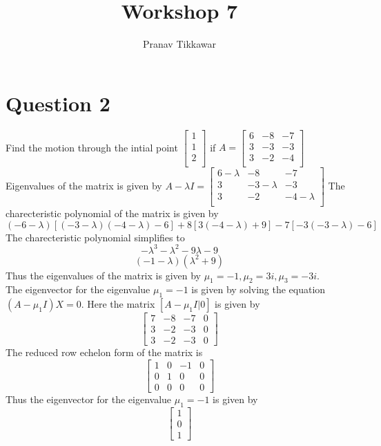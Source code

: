 \documentclass{article}
\author{Pranav Tikkawar}
\title{Workshop 7}
\begin{document}
\maketitle
\section*{Question 2}
Find the motion through the intial point $\begin{bmatrix}
    1\\
    1\\
    2\\
\end{bmatrix}$ if $ A = \begin{bmatrix}
    6 & -8 & -7 \\
    3 & -3 & -3 \\
    3 & -2 & -4 \\
\end{bmatrix}$ \\
Eigenvalues of the matrix is given by $A - \lambda I = \begin{bmatrix}
    6 - \lambda & -8 & -7 \\
    3 & -3 - \lambda & -3 \\
    3 & -2 & -4 - \lambda \\
\end{bmatrix} $
The charecteristic polynomial of the matrix is given by
$$(-6 - \lambda)[(-3-\lambda)(-4-\lambda) - 6] + 8[3(-4-\lambda) + 9] - 7[-3(-3-\lambda) - 6] $$
The charecteristic polynomial simplifies to $$-\lambda^3 - \lambda^2 -9 \lambda - 9$$
$$(-1 - \lambda)(\lambda^2 + 9)$$
Thus the eigenvalues of the matrix is given by $\mu_1 = -1, \mu_2 = 3i, \mu_3 = -3i$.\\
The eigenvector for the eigenvalue $\mu_1 = -1$ is given by solving the equation $(A - \mu_1 I)X = 0$. Here the matrix $[A - \mu_1 I | 0]$ is given by
$$\begin{bmatrix}
    7 & -8 & -7 & 0\\
    3 & -2 & -3 & 0\\
    3 & -2 & -3 &0
\end{bmatrix} $$
The reduced row echelon form of the matrix is
$$\begin{bmatrix}
    1 & 0 & -1 & 0\\
    0 & 1 & 0 & 0\\
    0 & 0 & 0 & 0 
\end{bmatrix} $$
Thus the eigenvector for the eigenvalue $\mu_1 = -1$ is given by
$$\begin{bmatrix}
    1\\
    0\\
    1
\end{bmatrix} $$
\end{document}
